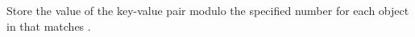 Store the value of the key-value pair modulo the specified number for each
object in  that matches .


